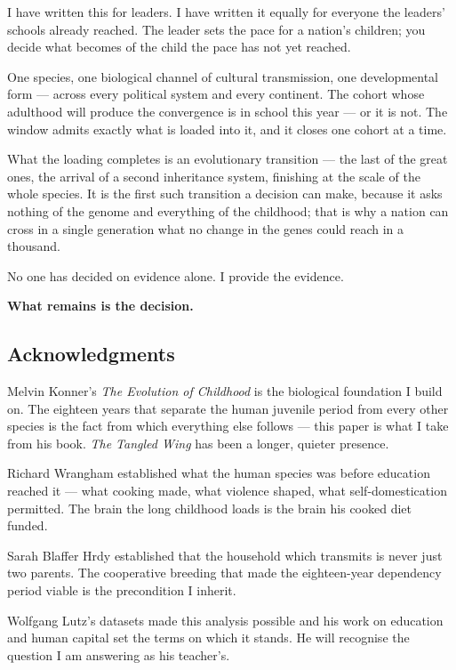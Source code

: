 \documentclass[12pt,letterpaper]{article}
\begin{document}
I have written this for leaders. I have written it equally for everyone
the leaders' schools already reached. The leader sets the pace for a
nation's children; you decide what becomes of the child the pace has
not yet reached.

One species, one biological channel of cultural transmission, one
developmental form --- across every political system and every
continent. The cohort whose adulthood will produce the convergence
is in school this year --- or it is not. The window
admits exactly what is loaded into it, and it closes one cohort at a
time.

What the loading completes is an evolutionary transition --- the last of
the great ones, the arrival of a second inheritance system, finishing at
the scale of the whole species. It is the first such transition a
decision can make, because it asks nothing of the genome and everything
of the childhood; that is why a nation can cross in a single generation
what no change in the genes could reach in a thousand.

No one has decided on evidence alone. I provide the evidence.

\textbf{What remains is the decision.}

\subsection*{Acknowledgments}

Melvin Konner's \emph{The Evolution of Childhood} is the biological
foundation I build on. The eighteen years that separate the human
juvenile period from every other species is the fact from which
everything else follows --- this paper is what I take from his book.
\emph{The Tangled Wing} has been a longer, quieter presence.

Richard Wrangham established what the human species was before
education reached it --- what cooking made, what violence shaped,
what self-domestication permitted. The brain the long childhood
loads is the brain his cooked diet funded.

Sarah Blaffer Hrdy established that the household which transmits is
never just two parents. The cooperative breeding that made the
eighteen-year dependency period viable is the precondition I
inherit.

Wolfgang Lutz's datasets made this analysis possible and his work on
education and human capital set the terms on which it stands. He
will recognise the question I am answering as his teacher's.
\end{document}
